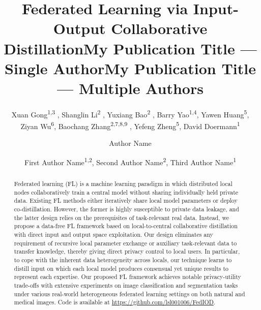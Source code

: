 \documentclass[letterpaper]{article} %
\title{Federated Learning via Input-Output Collaborative Distillation}
\author{
    Xuan Gong\textsuperscript{\rm 1,\rm 3 \equalcontrib},
    Shanglin Li\textsuperscript{\rm 2 \equalcontrib},
    Yuxiang Bao\textsuperscript{\rm 2 \equalcontrib},
    Barry Yao\textsuperscript{\rm 1,\rm 4},
    Yawen Huang\textsuperscript{\rm 5},
    Ziyan Wu\textsuperscript{\rm 6},
    Baochang Zhang\textsuperscript{\rm 2,\rm 7,\rm 8,\rm 9 \dag},
    Yefeng Zheng\textsuperscript{\rm 5},
    David Doermann\textsuperscript{\rm 1 \dag}
}
\title{My Publication Title --- Single Author}
\author {
    Author Name
}
\title{My Publication Title --- Multiple Authors}
\author {
    First Author Name\textsuperscript{\rm 1,\rm 2},
    Second Author Name\textsuperscript{\rm 2},
    Third Author Name\textsuperscript{\rm 1}
}
\begin{document}
\maketitle

\begin{abstract}
   Federated learning (FL) is a machine learning paradigm in which distributed local nodes collaboratively train a central model without sharing individually held private data. Existing FL methods either iteratively share local model parameters or deploy co-distillation. However, the former is highly susceptible to private data leakage, and the latter design relies on the prerequisites of task-relevant real data. Instead, we propose a data-free FL framework based on local-to-central collaborative distillation with direct input and output space exploitation. Our design eliminates any requirement of recursive local parameter exchange or auxiliary task-relevant data to transfer knowledge, thereby giving direct privacy control to local users. In particular, to cope with the inherent data heterogeneity across locals, our technique learns to distill input on which each local model produces consensual yet unique results to represent each expertise. Our proposed FL framework achieves notable privacy-utility trade-offs with extensive experiments on image classification and segmentation tasks under various real-world heterogeneous federated learning settings on both natural and medical images. Code is available at  \url{https://github.com/lsl001006/FedIOD}.
\end{abstract}
\renewcommand{\thefootnote}{\fnsymbol{footnote}}
\end{document}
